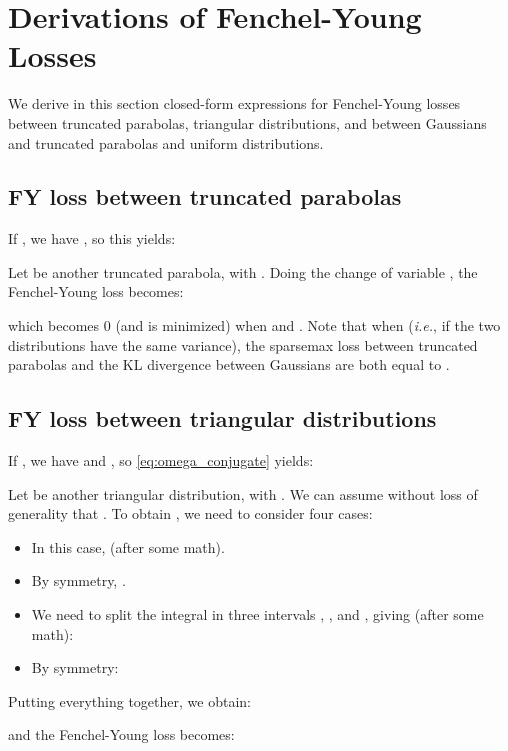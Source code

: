 \documentclass{article}
\begin{document}
{\section{Derivations of Fenchel-Young Losses}\label{sec:fy_example_derivations}

We derive in this section closed-form expressions for Fenchel-Young losses between truncated parabolas, triangular distributions, and between Gaussians and truncated parabolas and uniform distributions.

\subsection{FY loss between truncated parabolas}

If ,
we have , so this yields:

Let
 be another truncated parabola,
with .
Doing the change of variable ,
the Fenchel-Young loss becomes:

which becomes 0 (and is minimized) when  and .
Note that when  (\textit{i.e.}, if the two distributions have the same variance), the sparsemax loss between truncated parabolas and the KL divergence between Gaussians are both equal to .

\subsection{FY loss between triangular distributions}

If ,
we have 
and , so \eqref{eq:omega_conjugate} yields:

Let
 be another triangular distribution,
with .
We can assume without loss of generality that .
To obtain , we need to consider four cases:
\begin{itemize}
\item \framebox{}
In this case,  (after some math).
\item \framebox{}
By symmetry, .
\item \framebox{}
We need to split the integral in three intervals , , and , giving (after some math):

\item \framebox{}
By symmetry:

\end{itemize}
Putting everything together, we obtain:

and
the Fenchel-Young loss becomes:







}
\end{document}
